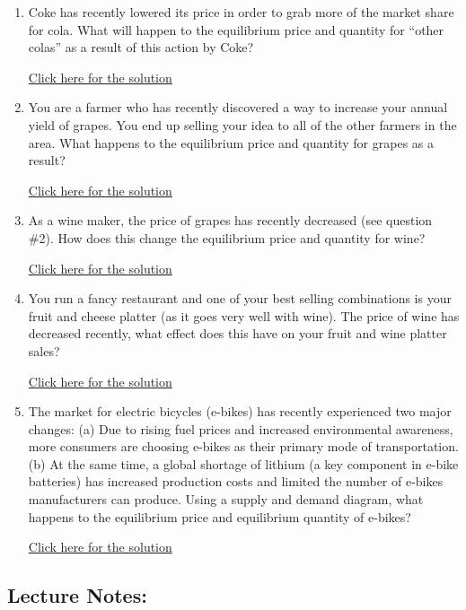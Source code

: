 \documentclass[
]{book}
\providecommand{\tightlist}{%
  \setlength{\itemsep}{0pt}\setlength{\parskip}{0pt}}
\begin{document}
\begin{enumerate}
\def\labelenumi{\arabic{enumi}.}
\tightlist
\item
  Coke has recently lowered its price in order to grab more of the market share for cola. What will happen to the equilibrium price and quantity for ``other colas'' as a result of this action by Coke?

  \href{https://youtu.be/CEzvcP93ARo}{Click here for the solution}
\item
  You are a farmer who has recently discovered a way to increase your annual yield of grapes. You end up selling your idea to all of the other farmers in the area. What happens to the equilibrium price and quantity for grapes as a result?

  \href{https://youtu.be/s6vObZi1PuY}{Click here for the solution}
\item
  As a wine maker, the price of grapes has recently decreased (see question \#2). How does this change the equilibrium price and quantity for wine?

  \href{https://youtu.be/ub-yZFjkZO4}{Click here for the solution}
\item
  You run a fancy restaurant and one of your best selling combinations is your fruit and cheese platter (as it goes very well with wine). The price of wine has decreased recently, what effect does this have on your fruit and wine platter sales?

  \href{https://youtu.be/t7KJD_0uoL0}{Click here for the solution}
\item
  The market for electric bicycles (e-bikes) has recently experienced two major changes: (a) Due to rising fuel prices and increased environmental awareness, more consumers are choosing e-bikes as their primary mode of transportation. (b) At the same time, a global shortage of lithium (a key component in e-bike batteries) has increased production costs and limited the number of e-bikes manufacturers can produce. Using a supply and demand diagram, what happens to the equilibrium price and equilibrium quantity of e-bikes?

  \href{https://youtu.be/rXxkmAUtmQI}{Click here for the solution}
\end{enumerate}

\subsection*{Lecture Notes:}\label{lecture-notes-3}
\end{document}
